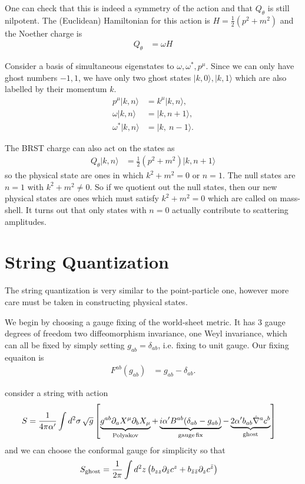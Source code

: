 \documentclass[notitlepage,amsmath,amssymb,aps, pra, 10pt]{revtex4-1}
\begin{document}
    One can check that this is indeed a symmetry of the action and that $Q_{\theta}$ is still nilpotent. The (Euclidean) Hamiltonian for this action is $H = \frac{1}{2} ( p^2 + m^2) $ and the Noether charge is
    \begin{align}
        Q_{\theta} &= \omega H
    \end{align}

    Consider a basis of simultaneous eigenstates to $\omega, \omega ^*, p^{\mu}$. Since we can only have ghost numbers $-1, 1$, we have only two ghost states $| k, 0\rangle, | k, 1 \rangle$ which are also labelled by their momentum $k$.
    \begin{align}
      p^{\mu} | k, n \rangle &= k^{\mu} | k,  n \rangle,\\
      \omega | k, n \rangle &=  | k,  n+1 \rangle,\\
      \omega^*| k, n \rangle &= | k, \ n-1 \rangle.
    \end{align}

    The BRST charge can also act on the states as
    \begin{align}
        Q_{\theta} | k, n \rangle &=\frac{1}{2} ( p^2 + m^2)  | k, n +1 \rangle
    \end{align}
    so the physical state are ones in which $k^2 + m^2 = 0 $ or $ n = 1$. The null states are $n = 1$ with $k^2 + m^2 \neq 0 $. So if we quotient out the null states, then our new physical states are ones which must satisfy $k^2 + m^2 = 0$ which are called on mass-shell. It turns out that only states with $n=0$ actually contribute to scattering amplitudes.

\section{String Quantization}
    The string quantization is very similar to the point-particle one, however more care must be taken  in constructing physical states.

    We begin by choosing a gauge fixing of the world-sheet metric. It has 3 gauge degrees of freedom two diffeomorphism invariance, one Weyl invariance, which can all be fixed by simply setting $g_{ab} = \delta_{ab}$, i.e. fixing to unit gauge. Our fixing equaiton is
    \begin{align}
        F^{ab}(g_{ab}) &= g_{ab} - \delta_{ab}.
    \end{align}

    consider a string with action
    \begin{align}
        S &= \frac{1}{4\pi \alpha'} \int d^2\sigma\, \sqrt{g} \left[\underbrace{g^{ab}\partial_a X^{\mu}\partial_b X_{\mu}}_{\rm Polyakov}  +\underbrace{i \alpha ' B^{ab}(\delta_{ab} - g_{ab})}_{\rm gauge\,fix} - \underbrace{2\alpha' b_{ab}\hat\nabla^{a} c^{b}}_{\rm ghost} \right]
    \end{align}
    and we can choose the conformal gauge for simplicity so that
    \begin{align}
        S_{\rm ghost} &= \frac{1}{2\pi}\int d^2z \left( b_{zz} \partial_{\bar{z}} c^{z} + b_{\bar z \bar z} \partial_z c^{\bar z}\right)
    \end{align}
\end{document}
